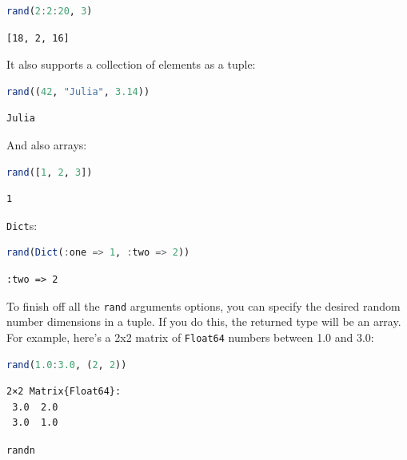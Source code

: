 \documentclass[
  notoc %
]{tufte-book}
\makeatletter
\newcommand{\passthrough}[1]{#1}
\renewcommand\subsubsection{%
\@startsection{subsubsection}{3}{\z@ }{-3.25ex\@plus -1ex \@minus -.2ex}{1.5ex \@plus .2ex}{\normalfont \normalsize \bfseries }
}
\makeatother
\begin{document}
\begin{lstlisting}[language=Julia]
rand(2:2:20, 3)
\end{lstlisting}

\begin{lstlisting}[language=Output]
[18, 2, 16]
\end{lstlisting}

It also supports a collection of elements as a tuple:

\begin{lstlisting}[language=Julia]
rand((42, "Julia", 3.14))
\end{lstlisting}

\begin{lstlisting}[language=Output]
Julia
\end{lstlisting}

And also arrays:

\begin{lstlisting}[language=Julia]
rand([1, 2, 3])
\end{lstlisting}

\begin{lstlisting}[language=Output]
1
\end{lstlisting}

\passthrough{\lstinline!Dict!}s:

\begin{lstlisting}[language=Julia]
rand(Dict(:one => 1, :two => 2))
\end{lstlisting}

\begin{lstlisting}[language=Output]
:two => 2
\end{lstlisting}

To finish off all the \passthrough{\lstinline!rand!} arguments options,
you can specify the desired random number dimensions in a tuple. If you
do this, the returned type will be an array. For example, here's a 2x2
matrix of \passthrough{\lstinline!Float64!} numbers between 1.0 and 3.0:

\begin{lstlisting}[language=Julia]
rand(1.0:3.0, (2, 2))
\end{lstlisting}

\begin{lstlisting}[language=Output]
2×2 Matrix{Float64}:
 3.0  2.0
 3.0  1.0
\end{lstlisting}

\hypertarget{sec:random_randn}{%
\subsubsection{\texorpdfstring{\texttt{randn}}{randn}}\label{sec:random_randn}}
\end{document}
